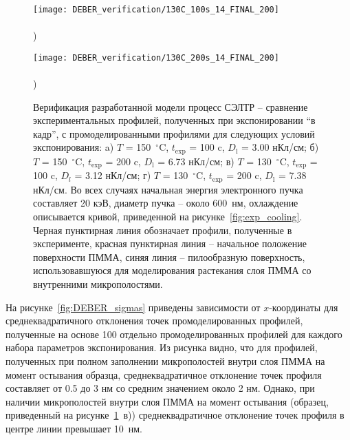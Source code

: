 \begin{figure}[h!]
	\begin{minipage}{0.48\textwidth}
		\texttt{[image: DEBER\_verification/130C\_100s\_14\_FINAL\_200]} \\
		\vspace{-13em} \\ ) \\ \vspace{13em}
	\end{minipage}
	\begin{minipage}{0.48\textwidth}
		\texttt{[image: DEBER\_verification/130C\_200s\_14\_FINAL\_200]} \\
		\vspace{-13em} \\ ) \\ \vspace{13em}
	\end{minipage}
	\vspace{-3em}
	\caption{Верификация разработанной модели процесс СЭЛТР -- сравнение экспериментальных профилей, полученных при экспонировании \linebreak ``в кадр'', с промоделированными профилями для следующих условий экспонирования: a) $T$ = 150~$^\circ$C, $t_\mathrm{exp}$ = 100 c, $D_\mathrm{l}$ = 3.00 нКл/см; б) $T$ = 150~$^\circ$C, $t_\mathrm{exp}$ = 200 c, $D_\mathrm{l}$ = 6.73 нКл/см; в) $T$ = 130~$^\circ$C, $t_\mathrm{exp}$ = 100 c, $D_l$ = 3.12 нКл/см; \linebreak г) $T$ = 130~$^\circ$C, $t_\mathrm{exp}$ = 200 c, $D_\mathrm{l}$ = 7.38 нКл/см. Во всех случаях начальная энергия электронного пучка составляет 20 кэВ, диаметр пучка -- около 600~нм, охлаждение описывается кривой, приведенной на рисунке~\ref{fig:exp_cooling}. Черная пунктирная линия обозначает профили, полученные в эксперименте, красная пунктирная линия -- начальное положение поверхности ПММА, синяя линия -- пилообразную поверхность, использовавшуюся для моделирования растекания слоя ПММА со внутренними микрополостями.}
	\label{fig:DEBER_4_profiles}
	\vspace{1em}
\end{figure}

На рисунке~\ref{fig:DEBER_sigmas} приведены зависимости от $x$-координаты для среднеквадратичного отклонения точек промоделированных профилей, полученные на основе 100 отдельно промоделированных профилей для каждого набора параметров экспонирования. Из рисунка видно, что для профилей, полученных при полном заполнении микрополостей внутри слоя ПММА на момент остывания образца, среднеквадратичное отклонение точек профиля составляет от 0.5 до 3 нм со средним значением около 2 нм. Однако, при наличии микрополостей внутри слоя ПММА на момент остывания (образец, приведенный на рисунке~\ref{fig:DEBER_4_profiles}~в)) среднеквадратичное отклонение точек профиля в центре линии превышает 10~нм.

